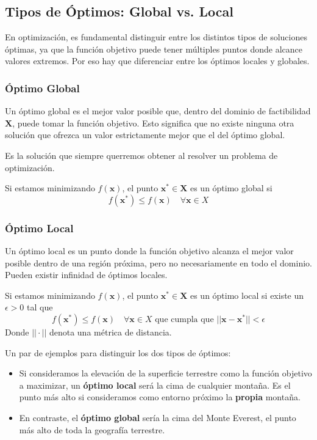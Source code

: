 \documentclass[12pt,a4paper]{book}
\begin{document}
\hrulefill

\subsection{Tipos de Óptimos: Global vs. Local}

En optimización, es fundamental distinguir entre los distintos tipos de soluciones óptimas, ya que la función objetivo puede tener múltiples puntos donde alcance valores extremos. Por eso hay que diferenciar entre los óptimos locales y globales.

\subsubsection{Óptimo Global}
Un óptimo global es el mejor valor posible que, dentro del dominio de factibilidad $\mathbf{X}$, puede tomar la función objetivo. Esto significa que no existe ninguna otra solución que ofrezca un valor estrictamente mejor que el del óptimo global.

Es la solución que siempre querremos obtener al resolver un problema de optimización.

Si estamos minimizando $f(\mathbf{x})$, el punto $\mathbf{x}^* \in \mathbf{X}$ es un óptimo global si
$$f(\mathbf{x}^*)\leq f(\mathbf{x}) \quad \forall \mathbf{x}\in X$$

\subsubsection{Óptimo Local}
Un óptimo local es un punto donde la función objetivo alcanza el mejor valor posible dentro de una región próxima, pero no necesariamente en todo el dominio. Pueden existir infinidad de óptimos locales.

Si estamos minimizando $f(\mathbf{x})$, el punto $\mathbf{x}^* \in \mathbf{X}$ es un óptimo local si existe un $\epsilon>0$ tal que
$$f(\mathbf{x}^*)\leq f(\mathbf{x}) \quad \forall \mathbf{x}\in X \text{ que cumpla que }||\mathbf{x}-\mathbf{x}^*||<\epsilon$$
Donde $||\cdot||$ denota una métrica de distancia.

Un par de ejemplos para distinguir los dos tipos de óptimos:
\begin{itemize}
    \item Si consideramos la elevación de la superficie terrestre como la función objetivo a maximizar, un \textbf{óptimo local} será la cima de cualquier montaña. Es el punto más alto si consideramos como entorno próximo la \textbf{propia} montaña.
    \item En contraste, el \textbf{óptimo global} sería la cima del Monte Everest, el punto más alto de toda la geografía terrestre.
\end{itemize}
\end{document}
